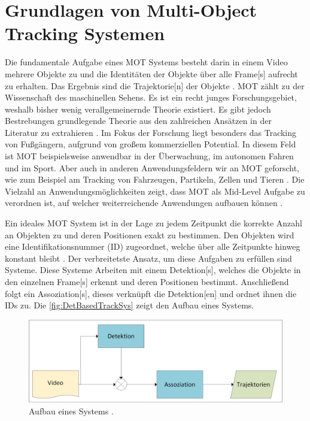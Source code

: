 \section{Grundlagen von Multi-Object Tracking Systemen}
Die fundamentale Aufgabe eines \gls{MOT} Systems besteht darin in einem Video mehrere Objekte zu  und die Identitäten der Objekte über alle \gls{Frame}[s] aufrecht zu erhalten. Das Ergebnis sind die \gls{Trajektorie}[n] der Objekte \cite{CLEAR.2008, HOTA, Luo.2022}. \gls{MOT} zählt zu der Wissenschaft des maschinellen Sehens. Es ist ein recht junges Forschungsgebiet, weshalb bisher wenig verallgemeinernde Theorie existiert. Es gibt jedoch Bestrebungen grundlegende Theorie aus den zahlreichen Ansätzen in der Literatur zu extrahieren \cite{Luo.2022}. Im Fokus der Forschung liegt besonders das Tracking von Fußgängern, aufgrund von großem kommerziellen Potential. In diesem Feld ist \gls{MOT} beispielsweise anwendbar in der Überwachung, im autonomen Fahren und im Sport. Aber auch in anderen Anwendungsfeldern wir an \gls{MOT} geforscht, wie zum Beispiel am Tracking von Fahrzeugen, Partikeln, Zellen und Tieren \cite{Luo.2022, CLEAR.2008, Crocker.1996}. Die Vielzahl an Anwendungsmöglichkeiten zeigt, dass \gls{MOT} als \gls{Mid-Level Aufgabe} zu verordnen ist, auf welcher weiterreichende Anwendungen aufbauen können \cite{Luo.2022}.\par

Ein ideales \gls{MOT} System ist in der Lage zu jedem Zeitpunkt die korrekte Anzahl an Objekten zu  und deren Positionen exakt zu bestimmen. Den Objekten wird eine Identifikationsnummer (\acrshort{ID}) zugeordnet, welche über alle Zeitpunkte hinweg konstant bleibt \cite{CLEAR.2008}. Der verbreitetste Ansatz, um diese Aufgaben zu erfüllen sind  Systeme. Diese Systeme  Arbeiten mit einem \gls{Detektion}[s], welches die Objekte in den einzelnen \gls{Frame}[s] erkennt und deren Positionen bestimmt. Anschließend folgt ein \gls{Assoziation}[s], dieses verknüpft die \gls{Detektion}[en] und ordnet ihnen die \acrshort{ID}s zu\cite{Luo.2022, HOTA}. Die \autoref{fig:DetBasedTrackSys} zeigt den Aufbau eines  Systems. 


\begin{figure}[htb]
\centering
\includegraphics[width=1\textwidth]{img/Grafiken/Detektionsbasiertes Tracking.png}
\caption{Aufbau eines  Systems \cite{Luo.2022}.}
\label{fig:DetBasedTrackSys}
\end{figure}


